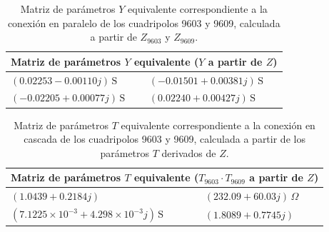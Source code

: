 \begin{table}[H]
\centering
\begin{tabular}{|l|l|}
\hline
\multicolumn{2}{|c|}{\textbf{Matriz de parámetros $Y$ equivalente ($Y$ a partir de $Z$)}} \\ \hline
$(0.02253 - 0.00110j)\,\mathrm{S}$ & $(-0.01501 + 0.00381j)\,\mathrm{S}$ \\ \hline
$(-0.02205 + 0.00077j)\,\mathrm{S}$ & $(0.02240 + 0.00427j)\,\mathrm{S}$ \\ \hline
\end{tabular}
\caption{Matriz de parámetros $Y$ equivalente correspondiente a la conexión en paralelo de los cuadripolos 9603 y 9609, calculada a partir de $Z_{9603}$ y $Z_{9609}$.}
\label{tab:matriz_Y_paralelo_desdeZ}
\end{table}

\begin{table}[H]
\centering
\begin{tabular}{|l|l|}
\hline
\multicolumn{2}{|c|}{\textbf{Matriz de parámetros $T$ equivalente ($T_{9603} \cdot T_{9609}$ a partir de $Z$)}} \\ \hline
$(1.0439 + 0.2184j)$ & $(232.09 + 60.03j)\,\Omega$ \\ \hline
$(7.1225\times10^{-3} + 4.298\times10^{-3}j)\,\mathrm{S}$ & $(1.8089 + 0.7745j)$ \\ \hline
\end{tabular}
\caption{Matriz de parámetros $T$ equivalente correspondiente a la conexión en cascada de los cuadripolos 9603 y 9609, calculada a partir de los parámetros $T$ derivados de $Z$.}
\label{tab:matriz_T_cascada_desdeZ}
\end{table}

	
	
	
	
	